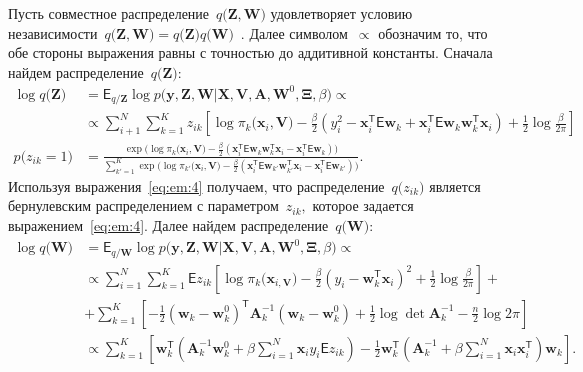 \documentclass[12pt, twoside]{article}
\numberwithin{equation}{section}
\begin{document}
Пусть совместное распределение~$q\bigr(\mathbf{Z}, \mathbf{W}\bigr)$ удовлетворяет условию независимости~$q\bigr(\mathbf{Z}, \mathbf{W}\bigr) = q\bigr(\mathbf{Z}\bigr)q\bigr(\mathbf{W}\bigr)$~\cite{bishop2006}. 
Далее символом~$\propto$ обозначим то, что обе стороны выражения равны с точностью до аддитивной константы.
Сначала найдем распределение~$q\bigr(\textbf{Z}\bigr)$:
\[
\label{eq:em:4}
\begin{aligned}
\log q\bigr(\textbf{Z}\bigr) &= \mathsf{E}_{q/\textbf{Z}} \log p\bigr(\mathbf{y}, \mathbf{Z}, \mathbf{W}|\mathbf{X}, \mathbf{V}, \textbf{A}, \textbf{W}^{0}, \bm{\Xi}, \beta\bigr)  \propto\\
&\propto \sum_{i+1}^{N}\sum_{k=1}^{K}z_{ik}\left[\log\pi_{k}\bigr(\textbf{x}_{i}, \textbf{V}\bigr) - \frac{\beta}{2}\left(y_{i}^{2} -\textbf{x}_{i}^{\mathsf{T}}\mathsf{E}\textbf{w}_{k} + \textbf{x}_{i}^{\mathsf{T}}\mathsf{E}\textbf{w}_{k}\textbf{w}_{k}^{\mathsf{T}}\textbf{x}_{i}\right) + \frac{1}{2}\log\frac{\beta}{2\pi}\right]\\
p\bigr(z_{ik} = 1\bigr) &= \frac{\exp\bigr(\log\pi_{k}\bigr(\textbf{x}_{i}, \textbf{V}\bigr) - \frac{\beta}{2}\left(\textbf{x}_{i}^{\mathsf{T}}\mathsf{E}\textbf{w}_{k}\textbf{w}_{k}^{\mathsf{T}}\textbf{x}_{i} - \textbf{x}_{i}^{\mathsf{T}}\mathsf{E}\textbf{w}_{k}\right)\bigr)}{\sum_{k'=1}^{K}\exp\bigr(\log\pi_{k'}\bigr(\textbf{x}_{i}, \textbf{V}\bigr) - \frac{\beta}{2}\left(\textbf{x}_{i}^{\mathsf{T}}\mathsf{E}\textbf{w}_{k'}\textbf{w}_{k'}^{\mathsf{T}}\textbf{x}_{i} - \textbf{x}_{i}^{\mathsf{T}}\mathsf{E}\textbf{w}_{k'}\right)\bigr)}.
\end{aligned}
\]
Используя выражения~\eqref{eq:em:4} получаем, что распределение~$q\bigr(z_{ik}\bigr)$ является бернулевским распределением с параметром~$z_{ik},$ которое задается выражением~\eqref{eq:em:4}.
Далее найдем распределение~$q\bigr(\textbf{W}\bigr)$:
\[
\label{eq:em:5}
\begin{aligned}
\log q\bigr(\textbf{W}\bigr) &= \mathsf{E}_{q/\textbf{W}}\log p\bigr(\mathbf{y}, \mathbf{Z}, \mathbf{W}|\mathbf{X}, \mathbf{V}, \textbf{A}, \textbf{W}^{0}, \bm{\Xi}, \beta\bigr) \propto\\
&\propto \sum_{i=1}^{N}\sum_{k=1}^{K}\mathsf{E}z_{ik}\left[\log\pi_{k}\bigr(\textbf{x}_{i, \textbf{V}}\bigr) - \frac{\beta}{2}\left(y_{i} - \textbf{w}_{k}^{\mathsf{T}}\textbf{x}_{i}\right)^{2} + \frac{1}{2}\log\frac{\beta}{2\pi}\right] + \\
&+ \sum_{k=1}^{K}\left[-\frac{1}{2}\left(\textbf{w}_{k} - \textbf{w}_{k}^{0}\right)^{\mathsf{T}}\textbf{A}_{k}^{-1}\left(\textbf{w}_{k} - \textbf{w}_{k}^{0}\right) + \frac{1}{2}\log\det\textbf{A}^{-1}_{k} - \frac{n}{2}\log2\pi\right] \\
&\propto \sum_{k=1}^{K}\left[\textbf{w}_{k}^{\mathsf{T}}\left(\textbf{A}_{k}^{-1}\textbf{w}_{k}^{0}+\beta\sum_{i=1}^{N}\textbf{x}_{i}y_{i}\mathsf{E}z_{ik}\right)-\frac{1}{2}\textbf{w}_{k}^{\mathsf{T}}\left(\textbf{A}_{k}^{-1}+\beta\sum_{i=1}^{N}\textbf{x}_{i}\textbf{x}_{i}^{\mathsf{T}}\right)\textbf{w}_{k}\right].
\end{aligned}
\]
\end{document}
